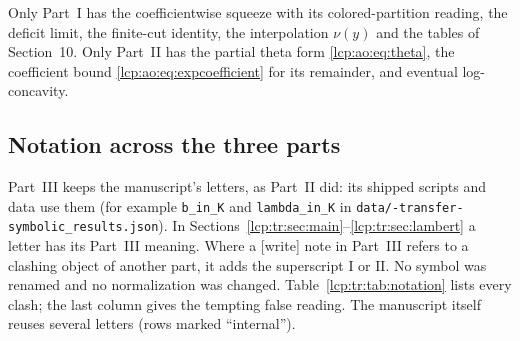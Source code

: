 \documentclass[11pt]{article}
\numberwithin{equation}{section}
\theoremstyle{definition}\newtheorem{definition}[theorem]{Definition}
\theoremstyle{remark}\newtheorem{remark}[theorem]{Remark}
\begin{document}
Only Part~I has the coefficientwise squeeze with its colored-partition
reading, the deficit limit, the finite-cut identity, the interpolation
$\nu(y)$ and the tables of Section~10. Only Part~II has the partial theta
form \eqref{lcp:ao:eq:theta}, the coefficient bound
\eqref{lcp:ao:eq:expcoefficient} for its remainder, and eventual
log-concavity.

\subsection{Notation across the three parts}\label{lcp:tr:sec:notation}
Part~III keeps the manuscript's letters, as Part~II did: its shipped
scripts and data use them (for example \texttt{b\_in\_K} and
\texttt{lambda\_in\_K} in \texttt{data/-transfer-symbolic\_results.json}).
In Sections~\ref{lcp:tr:sec:main}--\ref{lcp:tr:sec:lambert} a letter has its
Part~III meaning. Where a \textsf{[write]} note in Part~III refers to a
clashing object of another part, it adds the superscript $\mathrm I$ or
$\mathrm{II}$. No symbol was renamed and no normalization was changed.
Table~\ref{lcp:tr:tab:notation} lists every clash; the last column gives
the tempting false reading. The manuscript itself reuses several letters
(rows marked ``internal'').
\end{document}
